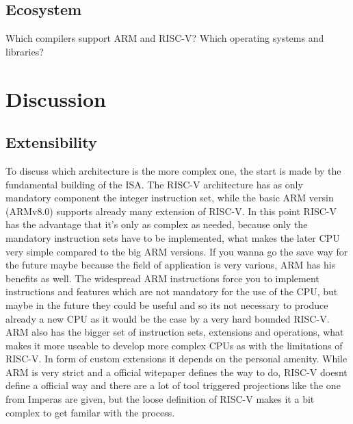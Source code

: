 \documentclass[conference]{IEEEtran}
\begin{document}
	\subsection{Ecosystem}
	Which compilers support ARM and RISC-V? Which operating systems and libraries?


\section{Discussion}
\label{ref:discussion}
	\subsection{Extensibility}
	To discuss which architecture is the more complex one, the start is made by the fundamental building of the \gls{ISA}. The RISC-V architecture has as only mandatory component the integer instruction set, while the basic ARM versin (ARMv8.0) supports already many extension of RISC-V. In this point RISC-V has the advantage that it's only as complex as needed, because only the mandatory instruction sets have to be implemented, what makes the later CPU very simple compared to the big ARM versions. If you wanna go the save way for the future maybe because the field of application is very various, ARM has his benefits as well. The widespread ARM instructions force you to implement instructions and features which are not mandatory for the use of the CPU, but maybe in the future they could be useful and so its not necessary to produce already a new CPU as it would be the case by a very hard bounded RISC-V. ARM also has the bigger set of instruction sets, extensions and operations, what makes it more useable to develop more complex CPUs as with the limitations of RISC-V.
	In form of custom extensions it depends on the personal amenity. While ARM is very strict and a official witepaper \cite{LauranneChoquin2020} defines the way to do, RISC-V doesnt define a official way and there are a lot of tool triggered projections like the one from Imperas \cite{Limited2019} are given, but the loose definition of RISC-V makes it a bit complex to get familar with the process.
	
\end{document}
